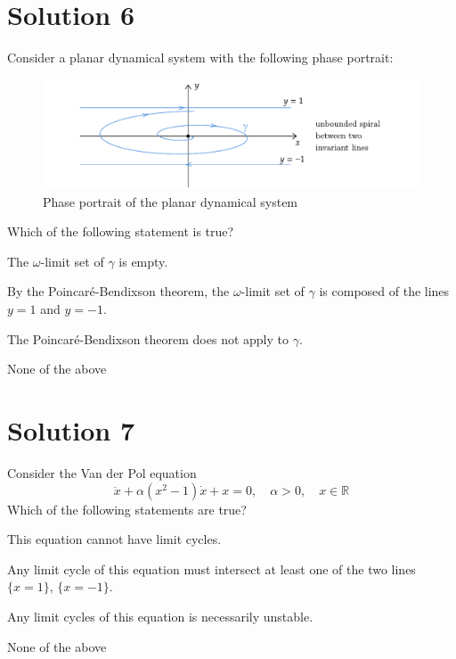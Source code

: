 \documentclass[twoside,10pt,a4paper]{article}
\begin{document}
\section*{Solution 6}
Consider a planar dynamical system with the following phase portrait:

\begin{figure}[H]
	\centering
	\includegraphics[scale=0.9]{Graphics/MCQ2_figures/Q04D01.pdf}
	\caption{Phase portrait of the planar dynamical system}
\end{figure}

Which of the following statement is true?

\begin{enumerate}[label=(\alph*)]
	\item The $\omega$-limit set of $\gamma$ is empty.
	\item By the Poincaré-Bendixson theorem, the $\omega$-limit set of $\gamma$ is composed of the lines $y = 1$ and $y = -1$.
	{\color{MyRed}\item The Poincaré-Bendixson theorem does not apply to $\gamma$.}
	\item None of the above
\end{enumerate}

\section*{Solution 7}
Consider the Van der Pol equation
\begin{equation*}
	\ddot{x} + \alpha(x^2 - 1)\dot{x} + x = 0, \quad \alpha > 0, \quad x \in \mathbb{R}
\end{equation*}
Which of the following statements are true?

\begin{enumerate}[label=(\alph*)]
	\item This equation cannot have limit cycles.
	{\color{MyRed}\item Any limit cycle of this equation must intersect at least one of the two lines $\{ x = 1 \}$, $\{ x = -1 \}$.}
	\item Any limit cycles of this equation is necessarily unstable.
	\item None of the above
\end{enumerate}
\end{document}
